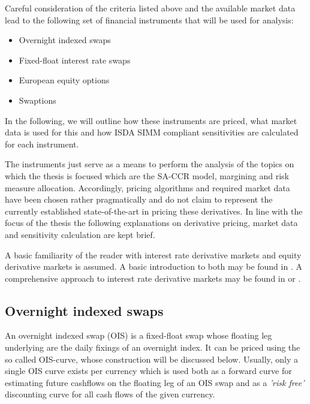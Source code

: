 \documentclass[../Thesis_AHoecherl.tex]{subfiles}
\begin{document}
    Careful consideration of the criteria listed above and the available market data lead to the following set of financial instruments that will be used for analysis:

    \begin{itemize}
        \item Overnight indexed swaps
        \item Fixed-float interest rate swaps
        \item European equity options
        \item Swaptions
    \end{itemize}

    In the following, we will outline how these instruments are priced, what market data is used for this and how \gls{ISDA SIMM} compliant sensitivities are calculated for each instrument.

    The instruments just serve as a means to perform the analysis of the topics on which the thesis is focused which are the \gls{SA-CCR} model, margining and risk measure allocation.
    Accordingly, pricing algorithms and required market data have been chosen rather pragmatically and do not claim to represent the currently established state-of-the-art in pricing these derivatives.
    In line with the focus of the thesis the following explanations on derivative pricing, market data and sensitivity calculation are kept brief.  

    A basic familiarity of the reader with interest rate derivative markets and equity derivative markets is assumed. 
    A basic introduction to both may be found in \cite{hull2009options}. A comprehensive approach to interest rate derivative markets may be found in \cite{brigo2007interest} or \cite{andersen2010interest}.

    \subsection{Overnight indexed swaps}\label{sec:Overnight indexed swap}

    An overnight indexed swap (\gls{OIS}) is a fixed-float swap whose floating leg underlying are the daily fixings of an overnight index.
    It can be priced using the so called \gls{OIS}-curve, whose construction will be discussed below.
    Usually, only a single \gls{OIS} curve exists per currency which is used both as a forward curve for estimating future cashflows on the floating leg of an OIS swap and as a \emph{'risk free'} discounting curve for all cash flows of the given currency.
\end{document}
